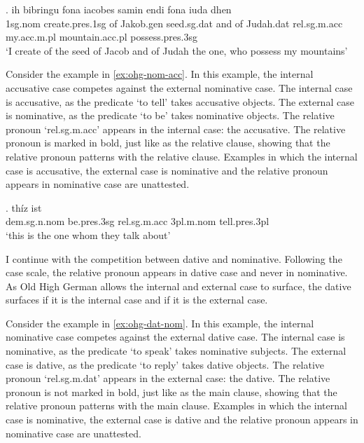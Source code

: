 \exg. ih bibringu fona iacobes samin endi fona iuda dhen   \\
1\ac{sg}.\ac{nom} {create}.\ac{pres}.1\ac{sg}\scsub{[acc]} of Jakob.\ac{gen} seed.\ac{sg}.\ac{dat} and of Judah.\ac{dat} \ac{rel}.\ac{sg}.\ac{m}.\ac{acc} my.\ac{acc}.\ac{m}.\ac{pl} mountain.\ac{acc}.\ac{pl} possess.\ac{pres}.3\ac{sg}\scsub{[nom]}\\
`I create of the seed of Jacob and of Judah the one, who possess my mountains' \label{ex:ohg-acc-nom}

Consider the example in \ref{ex:ohg-nom-acc}. In this example, the internal accusative case competes against the external nominative case.
The internal case is accusative, as the predicate  `to tell' takes accusative objects.
The external case is nominative, as the predicate  `to be' takes nominative objects.
The relative pronoun  `\ac{rel}.\ac{sg}.\ac{m}.\ac{acc}' appears in the internal case: the accusative. The relative pronoun is marked in bold, just like as the relative clause, showing that the relative pronoun patterns with the relative clause.
Examples in which the internal case is accusative, the external case is nominative and the relative pronoun appears in nominative case are unattested.

\exg. thíz ist   \\
\ac{dem}.\ac{sg}.\ac{n}.\ac{nom} be.\ac{pres}.3\ac{sg}\scsub{[nom]} \ac{rel}.\ac{sg}.\ac{m}.\ac{acc} 3\ac{pl}.\ac{m}.\ac{nom} tell.\ac{pres}.3\ac{pl}\scsub{[acc]}\\
`this is the one whom they talk about' \label{ex:ohg-nom-acc}

I continue with the competition between dative and nominative. Following the case scale, the relative pronoun appears in dative case and never in nominative. As Old High German allows the internal and external case to surface, the dative surfaces if it is the internal case and if it is the external case.

Consider the example in \ref{ex:ohg-dat-nom}. In this example, the internal nominative case competes against the external dative case.
The internal case is nominative, as the predicate  `to speak' takes nominative subjects.
The external case is dative, as the predicate  `to reply' takes dative objects.
The relative pronoun  `\ac{rel}.\ac{sg}.\ac{m}.\ac{dat}' appears in the external case: the dative. The relative pronoun is not marked in bold, just like as the main clause, showing that the relative pronoun patterns with the main clause.
Examples in which the internal case is nominative, the external case is dative and the relative pronoun appears in nominative case are unattested.

